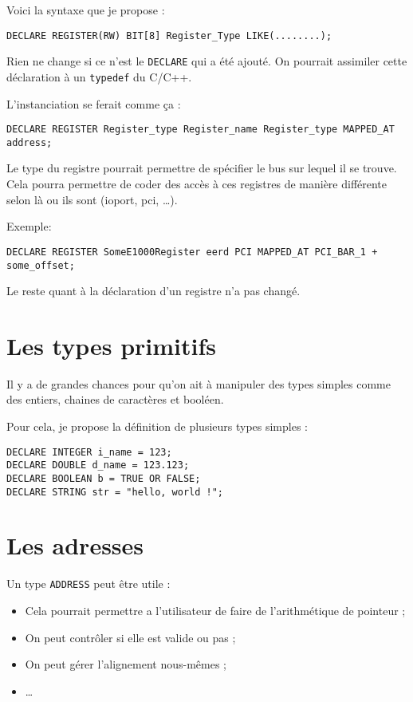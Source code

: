 \documentclass{rtxreport}
\begin{document}
Voici la syntaxe que je propose :
\begin{lstlisting}
DECLARE REGISTER(RW) BIT[8] Register_Type LIKE(........);
\end{lstlisting}
Rien ne change si ce n’est le \texttt{DECLARE} qui a été ajouté. On pourrait
assimiler cette déclaration à un \texttt{typedef} du C/C++.

L’instanciation se ferait comme ça :
\begin{lstlisting}
DECLARE REGISTER Register_type Register_name Register_type MAPPED_AT address;
\end{lstlisting}
Le type du registre pourrait permettre de spécifier le bus sur lequel il se
trouve. Cela pourra permettre de coder des accès à ces registres de manière
différente selon là ou ils sont (ioport, pci, \ldots).

Exemple:
\begin{lstlisting}
DECLARE REGISTER SomeE1000Register eerd PCI MAPPED_AT PCI_BAR_1 + some_offset;
\end{lstlisting}

Le reste quant à la déclaration d'un registre n'a pas changé.

\section{Les types primitifs}
Il y a de grandes chances pour qu’on ait à manipuler des types simples comme
des entiers, chaines de caractères et booléen.

Pour cela, je propose la définition de plusieurs types simples :
\begin{lstlisting}
DECLARE INTEGER i_name = 123;
DECLARE DOUBLE d_name = 123.123;
DECLARE BOOLEAN b = TRUE OR FALSE;
DECLARE STRING str = "hello, world !";
\end{lstlisting}

\section{Les adresses}

Un type \texttt{ADDRESS} peut être utile : 
\begin{itemize}
	\item Cela pourrait permettre a l’utilisateur de faire de l’arithmétique
    de pointeur ; 
	\item On peut contrôler si elle est valide ou pas ;
	\item On peut gérer l’alignement nous-mêmes ; 
	\item \ldots
\end{itemize}
\end{document}
